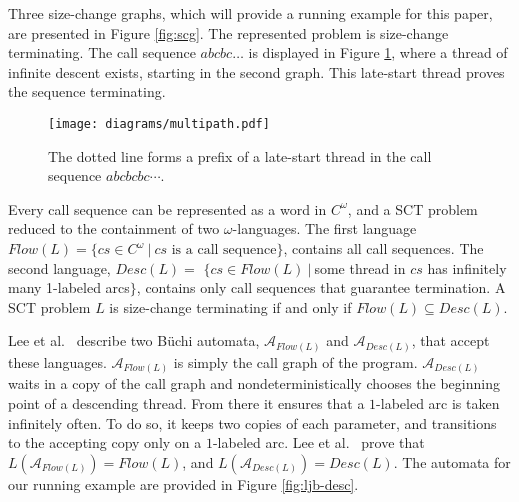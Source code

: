 \documentclass{LMCS}
\newcommand\buchi{B\"uchi }
\newcommand{\A}{{\mathcal A}}
\begin{document}
\begin{exa}
Three size-change graphs, which will provide a running example for this paper, are presented in
Figure \ref{fig:scg}. The represented problem is size-change terminating. The call sequence
$abcbc\ldots$ is displayed in Figure \ref{fig:late-start}, where a thread of infinite descent
exists, starting in the second graph. This late-start thread proves the sequence terminating.
\end{exa}



\begin{figure}[t]
\begin{center}
{\texttt{[image: diagrams/multipath.pdf]}}
\end{center}
\caption{The dotted line forms a prefix of a late-start thread in the call sequence $abcbcbc\cdots$.}\label{fig:late-start}
\end{figure}

Every call sequence can be represented as a word in $C^\omega$, and a SCT
problem reduced to the containment of two $\omega$-languages. The first language
$Flow(L) = \{cs \in C^\omega~|~cs\text{ is a call sequence}\}$, contains all
call sequences. The second language, $Desc(L) =$ $\{cs \in Flow(L)~|~$some
thread in $cs$ has infinitely many 1-labeled arcs$\}$, contains only call
sequences that guarantee termination. A SCT problem $L$ is size-change
terminating if and only if $Flow(L) \subseteq Desc(L)$.

Lee et al.~ \cite{LJB01} describe two \buchi automata, $\A_{Flow(L)}$ and
$\A_{Desc(L)}$, that accept these languages. $\A_{Flow(L)}$ is simply the call
graph of the program. $\A_{Desc(L)}$ waits in a copy of the call graph and
nondeterministically chooses the beginning point of a descending thread.  From
there it ensures that a $1$-labeled arc is taken infinitely often. To do so, it
keeps two copies of each parameter, and transitions to the accepting copy only
on a $1$-labeled arc.  Lee et al.~ prove that $L(\A_{Flow(L)})=Flow(L)$, and
$L(\A_{Desc(L)})=Desc(L)$. The automata for our running example are provided in Figure
\ref{fig:ljb-desc}.
\end{document}
